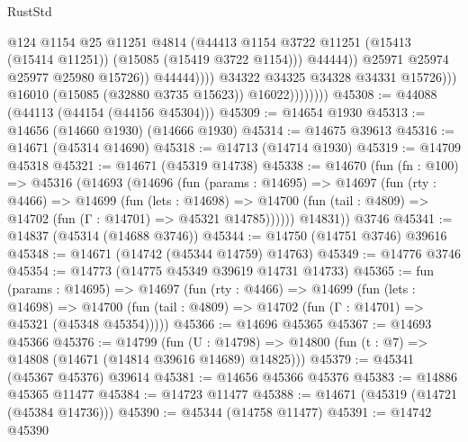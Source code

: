 \begin{lexlean}{RustStd}
\begin{coremodule}
                                          @124
                                          @1154
                                          @25
                                          @11251
                                          @4814
                                          (@44413
                                            @1154
                                            @3722
                                            @11251
                                            (@15413 (@15414 @11251))
                                            (@15085 (@15419 @3722 @1154)))
                                          @44444))
                                      @25971
                                      @25974
                                      @25977
                                      @25980
                                      @15726))
                                  @44444))))
                          @34322
                          @34325
                          @34328
                          @34331
                          @15726)))
                    @16010
                    (@15085 (@32880 @3735 @15623))
                    @16022))))))))
@45308 := @44088 (@44113 (@44154 (@44156 @45304)))
@45309 := @14654 @1930
@45313 := @14656 (@14660 @1930) (@14666 @1930)
@45314 := @14675 @39613
@45316 := @14671 (@45314 @14690)
@45318 := @14713 (@14714 @1930)
@45319 := @14709 @45318
@45321 := @14671 (@45319 @14738)
@45338 := @14670
    (fun (fn : @100) =>
    @45316
      (@14693
        (@14696
          (fun (params : @14695) =>
          @14697
            (fun (rty : @4466) =>
            @14699
              (fun (lets : @14698) =>
              @14700 (fun (tail : @4809) => @14702 (fun (Γ : @14701) => @45321 @14785))))))
        @14831))
    @3746
@45341 := @14837 (@45314 (@14688 @3746))
@45344 := @14750 (@14751 @3746) @39616
@45348 := @14671 (@14742 (@45344 @14759) @14763)
@45349 := @14776 @3746
@45354 := @14773 (@14775 @45349 @39619 @14731 @14733)
@45365 := fun (params : @14695) =>
  @14697
    (fun (rty : @4466) =>
    @14699
      (fun (lets : @14698) =>
      @14700 (fun (tail : @4809) => @14702 (fun (Γ : @14701) => @45321 (@45348 @45354)))))
@45366 := @14696 @45365
@45367 := @14693 @45366
@45376 := @14799
    (fun (U : @14798) => @14800 (fun (t : @7) => @14808 (@14671 (@14814 @39616 @14689) @14825)))
@45379 := @45341 (@45367 @45376) @39614
@45381 := @14656 @45366 @45376
@45383 := @14886 @45365 @11477
@45384 := @14723 @11477
@45388 := @14671 (@45319 (@14721 (@45384 @14736)))
@45390 := @45344 (@14758 @11477)
@45391 := @14742 @45390

\end{coremodule}
\end{lexlean}
